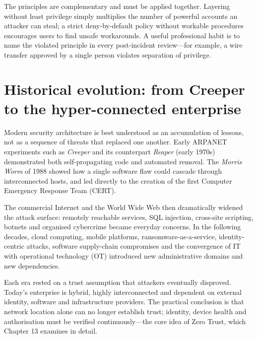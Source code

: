 \documentclass[11pt,openany]{book}
\begin{document}
The principles are complementary and must be applied together. Layering without least privilege simply multiplies the number of powerful accounts an attacker can steal; a strict deny-by-default policy without workable procedures encourages users to find unsafe workarounds. A useful professional habit is to name the violated principle in every post-incident review—for example, a wire transfer approved by a single person violates separation of privilege.

\section{Historical evolution: from Creeper to the hyper-connected enterprise}\label{sec:1.4}
Modern security architecture is best understood as an accumulation of lessons, not as a sequence of threats that replaced one another. Early ARPANET experiments such as \emph{Creeper} and its counterpart \emph{Reaper} (early 1970s) demonstrated both self-propagating code and automated removal. The \emph{Morris Worm} of 1988 showed how a single software flaw could cascade through interconnected hosts, and led directly to the creation of the first Computer Emergency Response Team (CERT).

The commercial Internet and the World Wide Web then dramatically widened the attack surface: remotely reachable services, SQL injection, cross-site scripting, botnets and organised cybercrime became everyday concerns. In the following decades, cloud computing, mobile platforms, ransomware-as-a-service, identity-centric attacks, software supply-chain compromises and the convergence of IT with operational technology (OT) introduced new administrative domains and new dependencies.

Each era rested on a trust assumption that attackers eventually disproved. Today's enterprise is hybrid, highly interconnected and dependent on external identity, software and infrastructure providers. The practical conclusion is that network location alone can no longer establish trust; identity, device health and authorisation must be verified continuously—the core idea of Zero Trust, which Chapter 13 examines in detail.
\end{document}
